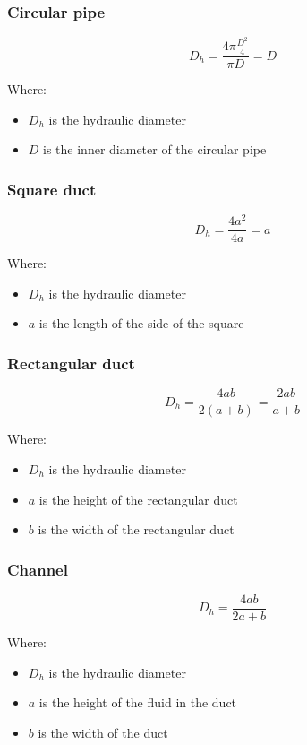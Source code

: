 \documentclass[11pt]{article}
\begin{document}
\subsubsection{Circular pipe}
\label{sec:orgd1fe078}
\[D_h = \frac{4 \pi \frac{D^2}{4}}{\pi D} = D\]

Where:
\begin{itemize}
\item \(D_h\) is the hydraulic diameter
\item \(D\) is the inner diameter of the circular pipe
\end{itemize}

\subsubsection{Square duct}
\label{sec:org0056256}
\[D_h = \frac{4a^2}{4a} = a\]

Where:
\begin{itemize}
\item \(D_h\) is the hydraulic diameter
\item \(a\) is the length of the side of the square
\end{itemize}

\subsubsection{Rectangular duct}
\label{sec:org3c46bc7}
\[D_h = \frac{4ab}{2(a + b)} = \frac{2ab}{a + b}\]

Where:
\begin{itemize}
\item \(D_h\) is the hydraulic diameter
\item \(a\) is the height of the rectangular duct
\item \(b\) is the width of the rectangular duct
\end{itemize}

\subsubsection{Channel}
\label{sec:org99daeb0}
\[D_h = \frac{4ab}{2a + b}\]

Where:
\begin{itemize}
\item \(D_h\) is the hydraulic diameter
\item \(a\) is the height of the fluid in the duct
\item \(b\) is the width of the duct
\end{itemize}
\end{document}
